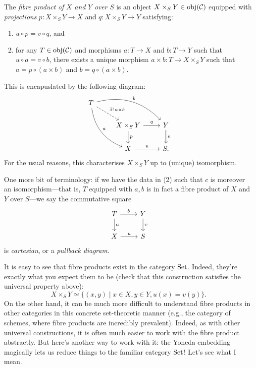 \begin{definition}
The \textit{fibre product of $X$ and $Y$ over $S$} is an object $X
\times_S Y \in \operatorname{obj}(\mathcal{C})$ equipped with \textit{projections} $p : X
\times_S Y \to X$ and $q : X \times_S Y \to Y$ satisfying:
\begin{enumerate}
\item $u \circ p = v \circ q$, and
\item for any $T \in \operatorname{obj}(\mathcal{C})$ and morphisms $a : T \to X$ and $b : T
  \to Y$ such that $u \circ a = v \circ b$, there exists a unique
  morphism $a \times b : T \to X \times_S Y$ such that $a = p \circ (a
  \times b)$ and $b = q \circ (a \times b)$.
\end{enumerate}
This is encapuslated by the following diagram:
\[
\begin{tikzcd}
  T \ar[bend left]{rrd}{b} \ar[bend right]{ddr}{a}
  \ar[dashed]{dr}{\exists!\, a \times b} & & \\ & X \times_S Y \rar{q}
  \dar{p} & Y \dar{v} \\ & X \rar{u} & S.
\end{tikzcd}
\]
For the usual reasons, this characterises $X \times_S Y$ up to
(unique) isomorphism.

One more bit of terminology: if we have the data in (2) such that $c$
is moreover an isomorphism---that is, $T$ equipped with $a,b$ is in
fact a fibre product of $X$ and $Y$ over $S$---we say the commutative
square
\[
\begin{tikzcd}
  T \rar{b} \dar{a} & Y \dar{v} \\ X \rar{u} & S
\end{tikzcd}
\]
is \textit{cartesian}, or a \textit{pullback diagram}.
\end{definition}

\begin{example}
  It is easy to see that fibre products exist in the category
  $\mathrm{Set}$. Indeed, they're exactly what you expect them to be (check
  that this construction satisfies the universal property above):
  \[
  X \times_S Y \simeq \{(x, y) \mid x \in X, y \in Y, u(x) = v(y)\}.
  \]
  On the other hand, it can be much more difficult to understand fibre
  products in other categories in this concrete set-theoretic manner
  (e.g., the category of schemes, where fibre products are incredibly
  prevalent). Indeed, as with other universal constructions, it is
  often much easier to work with the fibre product abstractly. But
  here's another way to work with it: the Yoneda embedding magically
  lets us reduce things to the familiar category $\mathrm{Set}$!  Let's see
  what I mean.
\end{example}


